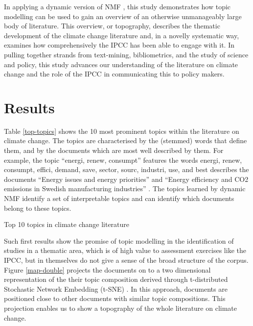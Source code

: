 \documentclass{article}
\begin{document}
\begin{linenumbers}

In applying a dynamic version of NMF \cite{Greene2016}, this study demonstrates how topic modelling can be used to gain an overview of an otherwise unmanageably large body of literature. This overview, or topography, describes the thematic development of the climate change literature and, in a novelly systematic way, examines how comprehensively the IPCC has been able to engage with it. In pulling together strands from text-mining, bibliometrics, and the study of science and policy, this study advances our understanding of the literature on climate change and the role of the IPCC in communicating this to policy makers.


\section*{Results}

Table \ref{top-topics} shows the 10 most prominent topics within the literature on climate change. The topics are characterised by the (stemmed) words that define them, and by the documents which are most well described by them. For example, the topic ``energi, renew, consumpt'' features the words energi, renew, consumpt,
effici, demand,
save, sector, sourc,
industri, use, and best describes the documents ``Energy issues and energy priorities'' \cite{Demirbas2008} and ``Energy efficiency and CO2 emissions in Swedish manufacturing industries'' \cite{PardoMartinez2013}. The topics learned by dynamic NMF identify a set of interpretable topics and can identify which documents belong to these topics. 

\begin{table}
	\scriptsize
	
	\caption{Top 10 topics in climate change literature}
	\label{top-topics}
\end{table}

Such first results show the promise of topic modelling in the identification of studies in a thematic area, which is of high value to assessment exercises like the IPCC, but in themselves do not give a sense of the broad structure of the corpus. Figure \ref{map-double} projects the documents on to a two dimensional representation of the their topic composition derived through t-distributed Stochastic Network Embedding (t-SNE) \cite{vandermaaten2008}. In this approach, documents are positioned close to other documents with similar topic compositions. This projection enables us to show a topography of the whole literature on climate change.


\end{linenumbers}
\end{document}
